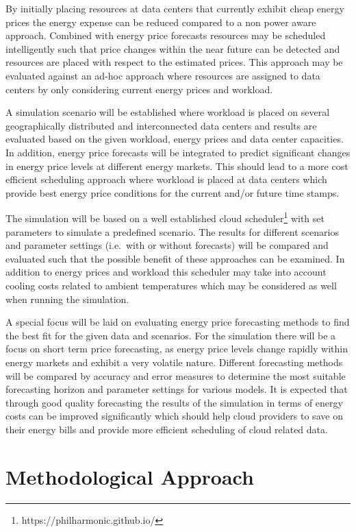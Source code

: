 \documentclass[a4paper]{article}
\begin{document}
By initially placing resources at data centers that currently exhibit cheap energy prices the energy expense can be reduced compared to a non power aware approach. Combined with energy price forecasts resources may be scheduled intelligently such that price changes within the near future can be detected and resources are placed with respect to the estimated prices. This approach may be evaluated against an ad-hoc approach where resources are assigned to data centers by only considering current energy prices and workload. 

A simulation scenario will be established where workload is placed on several geographically distributed and interconnected data centers and results are evaluated based on the given workload, energy prices and data center capacities. In addition, energy price forecasts will be integrated to predict significant changes in energy price levels at different energy markets. This should lead to a more cost efficient scheduling approach where workload is placed at data centers which provide best energy price conditions for the current and/or future time stamps. 

The simulation will be based on a well established cloud scheduler\footnote{https://philharmonic.github.io/} with set parameters to simulate a predefined scenario. The results for different scenarios and parameter settings (i.e.~with or without forecasts) will be compared and evaluated such that the possible benefit of these approaches can be examined. 
In addition to energy prices and workload this scheduler may take into account cooling costs related to ambient temperatures which may be considered as well when running the simulation. 

A special focus will be laid on evaluating energy price forecasting methods to find the best fit for the given data and scenarios. For the simulation there will be a focus on short term price forecasting, as energy price levels change rapidly within energy markets and exhibit a very volatile nature.  
Different forecasting methods will be compared by accuracy and error measures to determine the most suitable forecasting horizon and parameter settings for various models. It is expected that through good quality forecasting the results of the simulation in terms of energy costs can be improved significantly which should help cloud providers to save on their energy bills and provide more efficient scheduling of cloud related data. 


\section{Methodological Approach}
\end{document}
